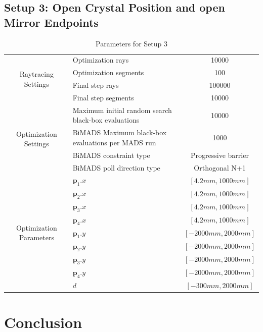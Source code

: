 \documentclass[a4paper,10pt]{article}
\renewcommand{\vec}[1]{\mathbf{#1}}
\begin{document}
    \subsection{Setup 3: Open Crystal Position and open Mirror Endpoints}
    
    \begin{table}
    \centering
    \setlength\tabcolsep{8pt}
    \renewcommand{\arraystretch}{1.5}
    \begin{tabular}{| c | p{40mm} | c |}
        \hline
        \multirow{4}{*}{Raytracing Settings} & Optimization rays & 10000 \\
        \cline{2-3}
        & Optimization segments & 100 \\
        \cline{2-3}
        & Final step rays & 100000 \\
        \cline{2-3}
        & Final step segments & 10000 \\
        \hline
        \multirow{4}{*}{Optimization Settings} & Maximum initial random search black-box evaluations & 10000 \\
        \cline{2-3}
        & BiMADS Maximum black-box evaluations per MADS run & 1000 \\
        \cline{2-3}
        & BiMADS constraint type & Progressive barrier \\
        \cline{2-3}
        & BiMADS poll direction type & Orthogonal N+1 \\
        \hline
        \multirow{9}{*}{Optimization Parameters} & 
        $\vec{p}_1.x$ & $[4.2mm, 1000mm]$ \\
        \cline{2-3}
        & $\vec{p}_2.x$ & $[4.2mm, 1000mm]$\\
        \cline{2-3}
        & $\vec{p}_3.x$ & $[4.2mm, 1000mm]$\\ 
        \cline{2-3}
        & $\vec{p}_4.x$ & $[4.2mm, 1000mm]$\\ 
        \cline{2-3}
        & $\vec{p}_1.y$ & $[-2000mm, 2000mm]$ \\
        \cline{2-3}
        & $\vec{p}_2.y$ & $[-2000mm, 2000mm]$\\
        \cline{2-3}
        & $\vec{p}_3.y$ & $[-2000mm, 2000mm]$\\ 
        \cline{2-3}
        & $\vec{p}_4.y$ & $[-2000mm, 2000mm]$\\ 
        \cline{2-3}
        & $d$ & $[-300mm, 2000mm]$\\ 
        \hline 
    \end{tabular}
    \caption{Parameters for Setup 3}
    \end{table}

    \section{Conclusion}
    \newpage

    
    
\end{document}
